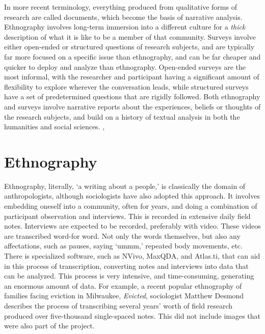 \documentclass[sigconf]{acmart}
\begin{document}
In more recent terminology, everything produced from qualitative forms of research are called documents, which become the basis of narrative analysis.  Ethnography involves long-term immersion into a different culture for a {\em thick} description of what it is like to be a member of that community.  Surveys involve either open-ended or structured questions of research subjects, and are typically far more focused on a specific issue than ethnography, and can be far cheaper and quicker to deploy and analyze than ethnography.  Open-ended surveys are the most informal, with the researcher and participant having a significant amount of flexibility to explore wherever the conversation leads, while structured surveys have a set of predetermined questions that are rigidly followed.  Both ethnography and surveys involve narrative reports about the experiences, beliefs or thoughts of the research subjects, and build on a history of textual analysis in both the humanities and social sciences. \cite{bryman16}, \cite{singleton18}

\section{Ethnography}
Ethnography, literally, `a writing about a people,' is classically the domain of anthropologists, although sociologists have also adopted this approach.  It involves embedding oneself into a community, often for years, and doing a combination of participant observation and interviews.  This is recorded in extensive daily field notes.  Interviews are expected to be recorded, preferably with video.  These videos are transcribed word-for word.  Not only the words themselves, but also any affectations, such as pauses, saying `ummm,' repeated body movements, etc.  There is specialized software, such as NVivo, MaxQDA, and Atlas.ti, that can aid in this process of transcription, converting notes and interviews into data that can be analyzed. \cite{hand14} This process is very intensive, and time-consuming, generating an enormous amount of data.  For example, a recent popular ethnography of families facing eviction in Milwaukee, {\em Evicted}, sociologist Matthew Desmond describes the process of transcribing several years' worth of field research produced over five-thousand single-spaced notes.  \cite{desmond16}  This did not include images that were also part of the project.  
\end{document}
